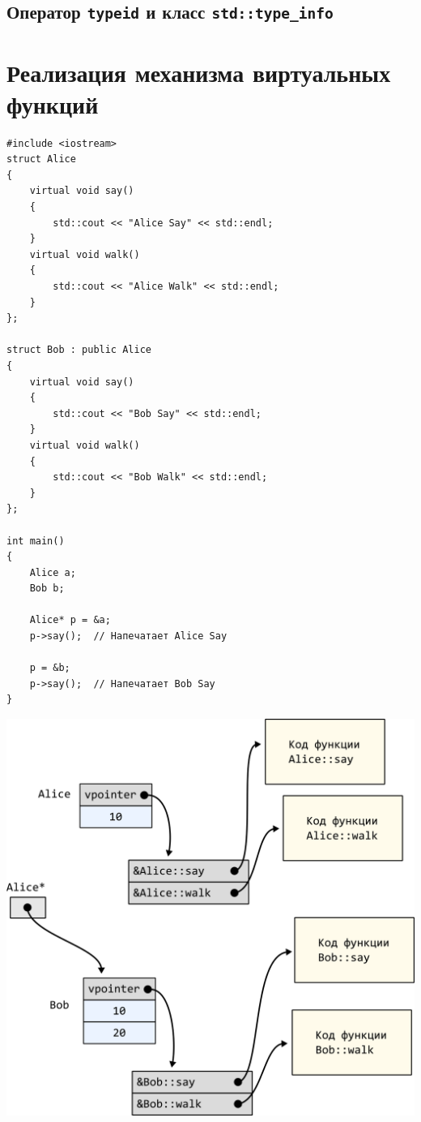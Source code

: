 \documentclass{article}
\begin{document}
\subsection*{Оператор \texttt{typeid} и класс \texttt{std::type\_info}}




\newpage
\section*{Реализация механизма виртуальных функций}
\begin{lstlisting}[style=csMiptCppBorderStyle]
#include <iostream>
struct Alice 
{
    virtual void say() 
    {
    	std::cout << "Alice Say" << std::endl;
    }
    virtual void walk() 
    {
    	std::cout << "Alice Walk" << std::endl;
    }
};

struct Bob : public Alice 
{
    virtual void say() 
    {
    	std::cout << "Bob Say" << std::endl;
    }
    virtual void walk() 
    {
    	std::cout << "Bob Walk" << std::endl;
    }
};

int main() 
{
    Alice a;
    Bob b;
    
    Alice* p = &a;
    p->say();  // Напечатает Alice Say
    
    p = &b;
    p->say();  // Напечатает Bob Say
}
\end{lstlisting}
\begin{center}
\includegraphics[scale=0.9]{../images/virtual_table_alice_bob.png}
\end{center}
\end{document}

